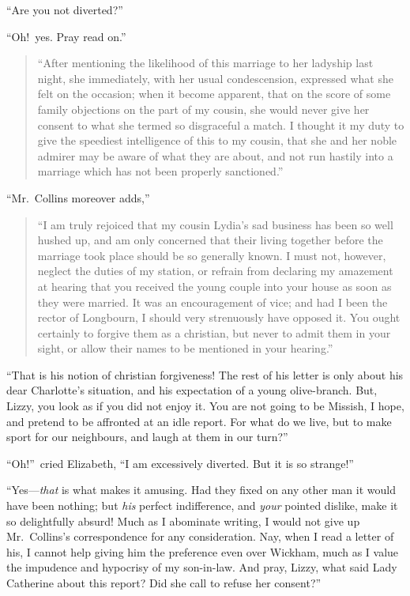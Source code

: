 \documentclass[12pt,english,oneside]{book}
\begin{document}
{}``Are you not diverted?''

{}``Oh!\ yes. Pray read on.''

\begin{quote}{}``After mentioning the likelihood of this marriage
to her ladyship last night, she immediately, with her usual condescension,
expressed what she felt on the occasion; when it become apparent,
that on the score of some family objections on the part of my cousin,
she would never give her consent to what she termed so disgraceful
a match. I thought it my duty to give the speediest intelligence of
this to my cousin, that she and her noble admirer may be aware of
what they are about, and not run hastily into a marriage which has
not been properly sanctioned.''\end{quote} {}``Mr.\ Collins moreover
adds,'' \begin{quote}{}``I am truly rejoiced that my cousin Lydia's
sad business has been so well hushed up, and am only concerned that
their living together before the marriage took place should be so
generally known. I must not, however, neglect the duties of my station,
or refrain from declaring my amazement at hearing that you received
the young couple into your house as soon as they were married. It
was an encouragement of vice; and had I been the rector of Longbourn,
I should very strenuously have opposed it. You ought certainly to
forgive them as a christian, but never to admit them in your sight,
or allow their names to be mentioned in your hearing.''\end{quote}
{}``That is his notion of christian forgiveness! The rest of his
letter is only about his dear Charlotte's situation, and his expectation
of a young olive-branch. But, Lizzy, you look as if you did not enjoy
it. You are not going to be Missish, I hope, and pretend to be affronted
at an idle report. For what do we live, but to make sport for our
neighbours, and laugh at them in our turn?''

{}``Oh!''\ cried Elizabeth, {}``I am excessively diverted. But
it is so strange!''

{}``Yes\mbox{---}\textit{that} is what makes it amusing. Had they
fixed on any other man it would have been nothing; but \textit{his}
perfect indifference, and \textit{your} pointed dislike, make it so
delightfully absurd! Much as I abominate writing, I would not give
up Mr.\ Collins's correspondence for any consideration. Nay, when
I read a letter of his, I cannot help giving him the preference even
over Wickham, much as I value the impudence and hypocrisy of my son-in-law.
And pray, Lizzy, what said Lady Catherine about this report? Did she
call to refuse her consent?''
\end{document}
